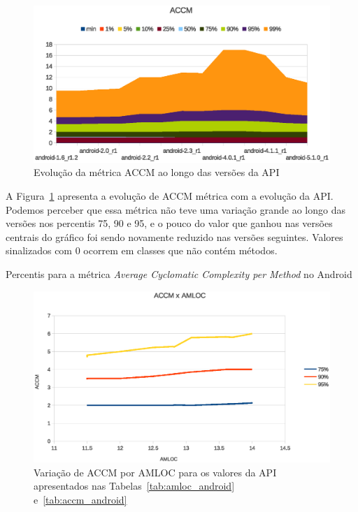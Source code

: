\begin{figure}[!htb]
\centering
\includegraphics [keepaspectratio=true,scale=0.85]{figuras/graphs/accm_android.eps}
\caption{Evolução da métrica ACCM ao longo das versões da API}
\label{fig:accm_android}
\end{figure}

A Figura~\ref{fig:accm_android} apresenta a evolução de ACCM métrica com a evolução da API. Podemos perceber que essa métrica não teve uma variação grande ao longo das versões nos percentis 75, 90 e 95, e o pouco do valor que ganhou nas versões centrais do gráfico foi sendo novamente reduzido nas versões seguintes. Valores sinalizados com 0 ocorrem em classes que não contém métodos.

\begin{table}[!htb]
\centering
{}

\caption{Percentis para a métrica \textit{Average Cyclomatic Complexity per Method} no Android}
\label{tab:accm_android}
\end{table}

\begin{figure}[!htb]
\centering
\includegraphics [keepaspectratio=true,scale=0.85]{figuras/ACCMxAMLOC.eps}
\caption{Variação de ACCM por AMLOC para os valores da API apresentados nas Tabelas~\ref{tab:amloc_android} e~\ref{tab:accm_android}}
\label{fig:accmxamloc}
\end{figure}

